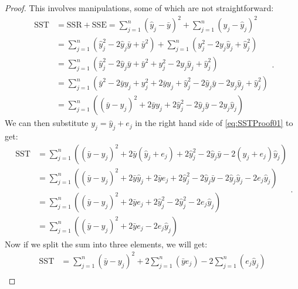 \documentclass[
]{book}
\theoremstyle{definition}
\theoremstyle{definition}
\theoremstyle{definition}
\theoremstyle{definition}
\theoremstyle{remark}
\begin{document}
\begin{proof}
This involves manipulations, some of which are not straightforward:
\begin{equation}
    \begin{aligned}
        \mathrm{SST} &= \mathrm{SSR} + \mathrm{SSE} = \sum_{j=1}^n (\hat{y}_j - \bar{y})^2 + \sum_{j=1}^n (y_j - \hat{y}_j)^2 \\
        &= \sum_{j=1}^n \left( \hat{y}_j^2 - 2 \hat{y}_j \bar{y} + \bar{y}^2 \right) + \sum_{j=1}^n \left( y_j^2 - 2 y_j \hat{y}_j + \hat{y}_j^2 \right) \\
        &= \sum_{j=1}^n \left( \hat{y}_j^2 - 2 \hat{y}_j \bar{y} + \bar{y}^2 + y_j^2 - 2 y_j \hat{y}_j + \hat{y}_j^2 \right) \\
        &= \sum_{j=1}^n \left(\bar{y}^2 -2 \bar{y} y_j + y_j^2 + 2 \bar{y} y_j + \hat{y}_j^2 - 2 \hat{y}_j \bar{y} - 2 y_j \hat{y}_j + \hat{y}_j^2 \right) \\
        &= \sum_{j=1}^n \left((\bar{y} - y_j)^2 + 2 \bar{y} y_j + 2 \hat{y}_j^2 - 2 \hat{y}_j \bar{y} - 2 y_j \hat{y}_j \right)
    \end{aligned} .
    \label{eq:SSTProof01}
\end{equation}
We can then substitute \(y_j=\hat{y}_j+e_j\) in the right hand side of \eqref{eq:SSTProof01} to get:
\begin{equation}
    \begin{aligned}
        \mathrm{SST} &= \sum_{j=1}^n \left((\bar{y} - y_j)^2 + 2 \bar{y} (\hat{y}_j+e_j) + 2 \hat{y}_j^2 - 2 \hat{y}_j \bar{y} - 2 (\hat{y}_j+e_j) \hat{y}_j \right) \\
        &= \sum_{j=1}^n \left((\bar{y} - y_j)^2 + 2 \bar{y} \hat{y}_j + 2 \bar{y} e_j + 2 \hat{y}_j^2 - 2 \hat{y}_j \bar{y} - 2 \hat{y}_j\hat{y}_j -2 e_j \hat{y}_j \right) \\
        &= \sum_{j=1}^n \left((\bar{y} - y_j)^2 + 2 \bar{y} e_j + 2 \hat{y}_j^2 - 2 \hat{y}_j^2 -2 e_j \hat{y}_j \right) \\
        &= \sum_{j=1}^n \left((\bar{y} - y_j)^2 + 2 \bar{y} e_j - 2 e_j \hat{y}_j \right) 
    \end{aligned} .
    \label{eq:SSTProof02}
\end{equation}
Now if we split the sum into three elements, we will get:
\begin{equation}
    \begin{aligned}
        \mathrm{SST} &= \sum_{j=1}^n (\bar{y} - y_j)^2 + 2 \sum_{j=1}^n \left(\bar{y} e_j\right) - 2 \sum_{j=1}^n \left(e_j \hat{y}_j \right) \\

\end{aligned}
\end{equation}
\end{proof}
\end{document}
